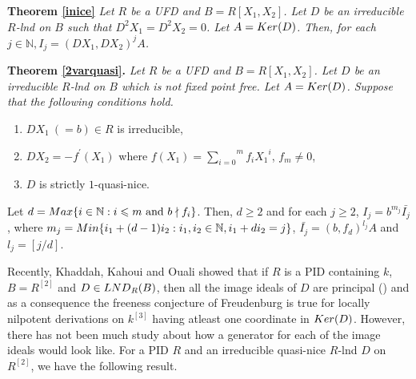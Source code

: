 \documentclass[a4paper,12pt]{article}
\newcommand{\bN}{\mathbb N}
\begin{document}
{	\medskip\noindent
	{\bf Theorem \ref{inice}} {\it Let $R$ be a {\rm UFD} and $B=R[X_1,X_2]$. Let $D$ be an irreducible $R$-lnd on $B$ such that $D^2X_1=D^2X_2=0$. Let $A={\rm Ker}(D)$. Then, for each $j\in \bN, I_j ={( DX_1,DX_2)}^jA$.}
	
	\medskip\noindent
	{\bf Theorem \ref{2varquasi}.} {\it Let $R$ be a {\rm UFD} and $B=R[X_1,X_2]$. Let $D$ be an irreducible $R$-lnd on $B$ which is not fixed point free. Let $A={\rm Ker}(D)$. Suppose that the following conditions hold.}
	\begin{enumerate}
\item[\rm(i)]$DX_1~(=b)\in R$ is irreducible,
\item[\rm(ii)]$DX_2=-f^{\prime}(X_1)$ where $f(X_1)=\overset{m}{\underset{i=0}{\sum}} f_i{X_1}^i$, $f_m\neq 0$,
\item[\rm(iii)]$D$ is strictly $1$-quasi-nice. 
\end{enumerate}
Let $d={\rm Max}\{i\in\bN:i\leqslant m \text{ and } b\nmid f_i\}$. Then, $d\geqslant 2$ and for each $j\geqslant 2$, $I_j=b^{m_j}\bar{I_j}$, where $m_j={\rm Min}\{i_1+(d-1)i_2:i_1,i_2\in\bN,i_1+di_2=j\}$, $\bar{I_j}={(b,f_d)}^{l_j}A$ and $l_j=[j/d].$


\medskip\noindent
Recently, Khaddah, Kahoui and Ouali showed that if $R$ is a PID containing $k$, $B=R^{[2]}$ and $D\in{\rm LND}_{R}(B)$, then all the image ideals of $D$ are principal (\cite[Theorem 4.1]{KKO22}) and as a consequence the freeness conjecture of Freudenburg is true for locally nilpotent derivations on $k^{[3]}$ having atleast one coordinate in ${\rm Ker}(D)$. However, there has not been much study about how a generator for each of the image ideals would look like. For a PID $R$ and an irreducible quasi-nice $R$-lnd $D$ on $R^{[2]}$, we have the following result.






%
%

}
\end{document}
